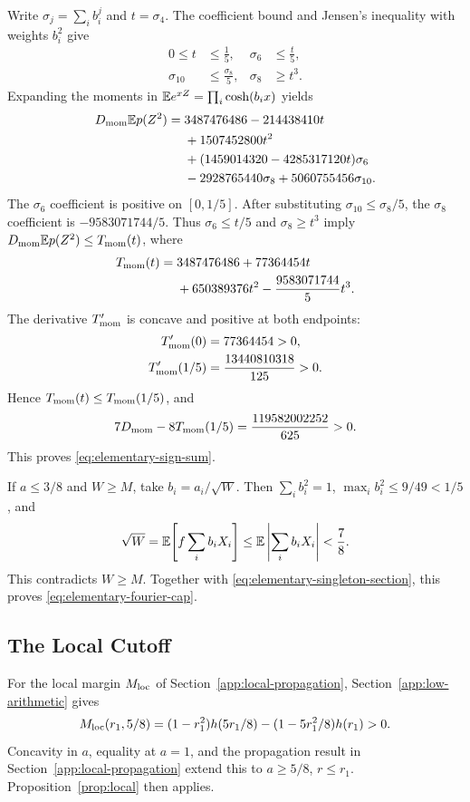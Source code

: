 Write \(\sigma_j=\sum_i b_i^j\) and \(t=\sigma_4\).
The coefficient bound and Jensen's inequality with weights \(b_i^2\) give
\begin{align*}
 0\le t&\le\frac15,& \sigma_6&\le\frac t5,\\
 \sigma_{10}&\le\frac{\sigma_8}{5},& \sigma_8&\ge t^3.
\end{align*}
Expanding the moments in \(\mathbb E e^{xZ}=\prod_i\cosh(b_ix)\) yields
\begin{align*}
 D_{\rm mom}\mathbb E p(Z^2)={}&3487476486-214438410t\\
 &+1507452800t^2\\
 &+(1459014320-4285317120t)\sigma_6\\
 &-2928765440\sigma_8+5060755456\sigma_{10}.
\end{align*}
The \(\sigma_6\) coefficient is positive on \([0,1/5]\).
After substituting \(\sigma_{10}\le\sigma_8/5\), the
\(\sigma_8\) coefficient is \(-9583071744/5\).
Thus \(\sigma_6\le t/5\) and \(\sigma_8\ge t^3\) imply
\(D_{\rm mom}\mathbb E p(Z^2)\le T_{\rm mom}(t)\), where
\begin{align*}
 T_{\rm mom}(t)={}&3487476486+77364454t\\
 &+650389376t^2-\frac{9583071744}{5}t^3.
\end{align*}
The derivative \(T_{\rm mom}'\) is concave and positive at both endpoints:
\begin{align*}
 T_{\rm mom}'(0)&=77364454>0,\\
 T_{\rm mom}'(1/5)&=\frac{13440810318}{125}>0.
\end{align*}
Hence \(T_{\rm mom}(t)\le T_{\rm mom}(1/5)\), and
\[
 7D_{\rm mom}-8T_{\rm mom}(1/5)=\frac{119582002252}{625}>0.
\]
This proves \eqref{eq:elementary-sign-sum}.

If \(a\le3/8\) and \(W\ge M\), take \(b_i=a_i/\sqrt W\).
Then \(\sum_i b_i^2=1\), \(\max_i b_i^2\le9/49<1/5\), and
\[
 \sqrt W=\mathbb E\!\left[f\sum_i b_iX_i\right]
       \le\mathbb E\left|\sum_i b_iX_i\right|<\frac78.
\]
This contradicts \(W\ge M\). Together with
\eqref{eq:elementary-singleton-section}, this proves
\eqref{eq:elementary-fourier-cap}.

\subsection{The Local Cutoff}
\label{app:low-local-check}

For the local margin \(M_{\rm loc}\) of
Section~\ref{app:local-propagation}, Section~\ref{app:low-arithmetic} gives
\[
 M_{\rm loc}(r_1,5/8)
  =(1-r_1^2)h(5r_1/8)-(1-5r_1^2/8)h(r_1)>0.
\]
Concavity in \(a\), equality at \(a=1\), and the propagation result
in Section~\ref{app:local-propagation} extend this to
\(a\ge5/8\), \(r\le r_1\). Proposition~\ref{prop:local} then applies.
